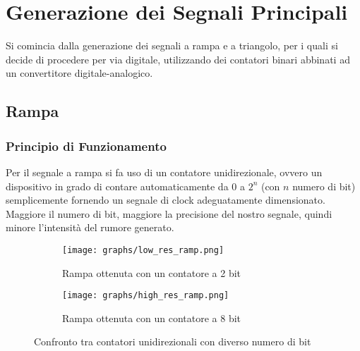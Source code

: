 \chapter{Generazione dei Segnali Principali}\label{segnali_principali}


Si comincia dalla generazione dei segnali a rampa e a triangolo, per i quali si decide di
procedere per via digitale, utilizzando dei contatori binari abbinati ad un convertitore
digitale-analogico.


\section{Rampa}


\subsection*{Principio di Funzionamento}


Per il segnale a rampa si fa uso di un contatore unidirezionale, ovvero un dispositivo
in grado di contare automaticamente da $0$ a $2^n$ (con $n$ numero di bit) semplicemente
fornendo un segnale di clock adeguatamente dimensionato. Maggiore il numero di bit,
maggiore la precisione del nostro segnale, quindi minore l'intensità del rumore generato.

\begin{figure}[H]
    \centering

    \begin{subfigure}{.5\textwidth}
        \centering
        \texttt{[image: graphs/low\_res\_ramp.png]}
        \caption{Rampa ottenuta con un contatore a 2 bit}
        \label{low_res_ramp}
    \end{subfigure}%
    \begin{subfigure}{.5\textwidth}
        \centering
        \texttt{[image: graphs/high\_res\_ramp.png]}
        \caption{Rampa ottenuta con un contatore a 8 bit}
        \label{high_res_ramp}
    \end{subfigure}

    \caption{Confronto tra contatori unidirezionali con diverso numero di bit}
    \label{ramps}
\end{figure}

